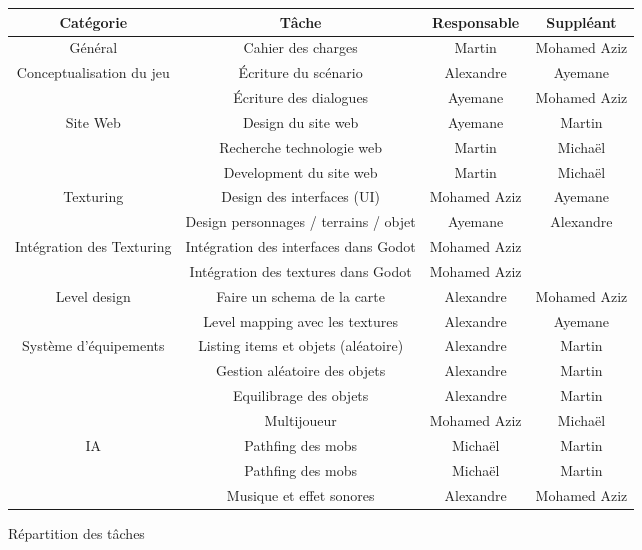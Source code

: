\begin{figure}[H]
    \centering
    \begin{tabular}{|c|c|c|c|}
        \hline
        \bfseries{Cat\'egorie} & \bfseries{T\^ache} & \bfseries{Responsable} & \bfseries{Suppl\'eant} \\
        \hline\hline
        G\'en\'eral & Cahier des charges & Martin & Mohamed Aziz \\
        \hline\hline
        \multirow{2}{*}{Conceptualisation du jeu} & \'Ecriture du sc\'enario & Alexandre & Ayemane \\
        \cline{2-4}
        & \'Ecriture des dialogues & Ayemane & Mohamed Aziz \\
        \hline\hline
        \multirow{3}{*}{Site Web} & Design du site web & Ayemane & Martin \\
        \cline{2-4}
        & Recherche technologie web & Martin & Michaël \\
        \cline{2-4}
        & Development du site web & Martin & Michaël \\
        \hline\hline
        \multirow{2}{*}{Texturing} & Design des interfaces (UI) & Mohamed Aziz & Ayemane \\
        \cline{2-4}
        & Design personnages / terrains / objet & Ayemane & Alexandre \\
        \hline\hline
        \multirow{2}{*}{Intégration des Texturing} & Int\'egration des interfaces dans Godot & Mohamed Aziz &  \\
        \cline{2-4}
        & Int\'egration des textures dans Godot & Mohamed Aziz & \\
        \hline\hline
        \multirow{2}{*}{Level design} & Faire un schema de la carte & Alexandre & Mohamed Aziz \\
        \cline{2-4}
        &Level mapping avec les textures & Alexandre & Ayemane \\
        \hline\hline
        \multirow{3}{*}{Système d'équipements} & Listing items et objets (al\'eatoire) & Alexandre & Martin \\
        \cline{2-4}
        & Gestion al\'eatoire des objets & Alexandre & Martin \\
        \cline{2-4}
        & Equilibrage des objets & Alexandre & Martin \\
        \hline\hline
        & Multijoueur & Mohamed Aziz & Michaël \\
        \hline\hline
        \multirow{2}{*}{IA} & Pathfing des mobs & Michaël & Martin \\
        \cline{2-4}
        & Pathfing des mobs & Michaël & Martin \\
        \hline\hline
        & Musique et effet sonores & Alexandre & Mohamed Aziz \\
        \hline


    \end{tabular}
    \caption{R\'epartition des tâches}
    \label{fig:repartition_des_taches}
\end{figure}


